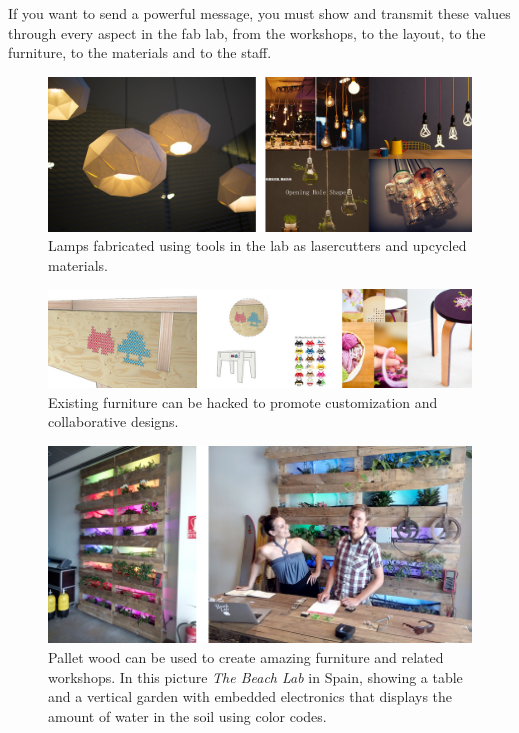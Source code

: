 \documentclass[a4paper,12pt,titlepage]{article}
\begin{document}
If you want to send a powerful message, you must show and transmit these values through every
aspect in the fab lab, from the workshops, to the layout, to the furniture, to the
materials and to the staff.

\begin{figure}[h] %
   \centering
   \includegraphics[width=16cm]{files/lamps} 
   \caption{Lamps fabricated using tools in the lab as lasercutters and upcycled materials.}
\end{figure}

\begin{figure}[h] %
   \centering
   \includegraphics[width=16cm]{files/knit} 
   \caption{Existing furniture can be hacked to promote customization and collaborative designs.}
\end{figure}

\begin{figure}[h] %
   \centering
   \includegraphics[width=16cm]{files/pallet} 
   \caption{Pallet wood can be used to create amazing furniture and related workshops. In this
picture \textit{The Beach Lab} in Spain, showing a table and a vertical garden with embedded
electronics that displays the amount of water in the soil using color codes.}
\end{figure}
\end{document}
